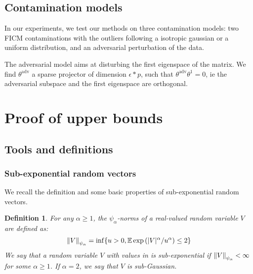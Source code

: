 \documentclass{article}
\numberwithin{equation}{section}
\newtheorem{definition}{Definition}
\numberwithin{equation}{section}
\begin{document}
    \subsection{Contamination models}
    
        In our experiments, we test our methods on three contamination models: two FICM contaminations with the outliers following a isotropic gaussian or a uniform distribution, and an adversarial perturbation of the data.
        
        The adversarial model aims at disturbing the first eigenspace of the matrix. We find $\theta^{\text{adv}}$ a sparse projector of dimension $\epsilon * p$, such that $\theta^{\text{adv}}\theta^1 = 0$, ie the adversarial subspace and the first eigenspace are orthogonal.
    
    
    
    
    
    

\section{Proof of upper bounds}
    \subsection{Tools and definitions}

    \subsubsection{Sub-exponential random vectors}
    
        We recall the definition and some basic properties of sub-exponential random vectors.
    
        \begin{definition}
            For any $\alpha \geq 1$, the $\psi_\alpha$-norms of a real-valued random variable $V$ are defined as:
            $$ \left\Vert V \right\Vert_{\psi_{\alpha}} = \inf \lbrace u> 0, \mathbb{E}\exp\left(\vert V \vert^\alpha / u^\alpha \right) \leq 2 \rbrace $$
            We say that a random variable $V$ with values in \real is sub-exponential if $\left\Vert V \right\Vert_{\psi_{\alpha}} < \infty$ for some $\alpha \geq 1$. If $\alpha = 2$, we say that $V$ is sub-Gaussian.
        \end{definition}
    
\end{document}
